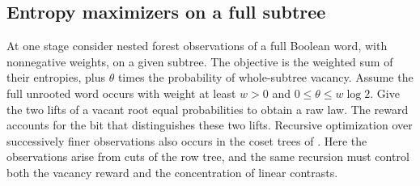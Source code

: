 \documentclass[11pt]{article}
\numberwithin{equation}{section}
\begin{document}
\subsection{Entropy maximizers on a full subtree}

At one stage consider nested forest observations of a full
Boolean word, with nonnegative weights, on a given subtree.
The objective is the weighted sum of their entropies, plus
$\theta$ times the probability of whole-subtree vacancy. Assume
the full unrooted word occurs with weight at least $w>0$ and
$0\le\theta\le w\log2$. Give the two lifts of a vacant root
equal probabilities to obtain a raw law. The reward accounts for
the bit that distinguishes these two lifts. Recursive optimization
over successively finer observations also occurs in the coset
trees of \cite[Section~7.2]{fgk}. Here the observations arise
from cuts of the row tree, and the same recursion must control
both the vacancy reward and the concentration of linear contrasts.
\end{document}
